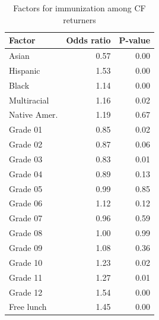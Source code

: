 \begin{multicols}{2}
\begin{table}[H]
\begin{table}[ht]
\centering
{\small
\begin{tabular}{lrr}
  \hline
Factor & Odds ratio & P-value \\ 
  \hline
Asian & 0.57 & 0.00 \\ 
  Hispanic & 1.53 & 0.00 \\ 
  Black & 1.14 & 0.00 \\ 
  Multiracial & 1.16 & 0.02 \\ 
  Native Amer. & 1.19 & 0.67 \\ 
  Grade 01 & 0.85 & 0.02 \\ 
  Grade 02 & 0.87 & 0.06 \\ 
  Grade 03 & 0.83 & 0.01 \\ 
  Grade 04 & 0.89 & 0.13 \\ 
  Grade 05 & 0.99 & 0.85 \\ 
  Grade 06 & 1.12 & 0.12 \\ 
  Grade 07 & 0.96 & 0.59 \\ 
  Grade 08 & 1.00 & 0.99 \\ 
  Grade 09 & 1.08 & 0.36 \\ 
  Grade 10 & 1.23 & 0.02 \\ 
  Grade 11 & 1.27 & 0.01 \\ 
  Grade 12 & 1.54 & 0.00 \\ 
  Free lunch & 1.45 & 0.00 \\ 
   \hline
\end{tabular}
}
\caption{Factors for immunization among CF returners} 
\end{table}\end{table}

\end{multicols}



